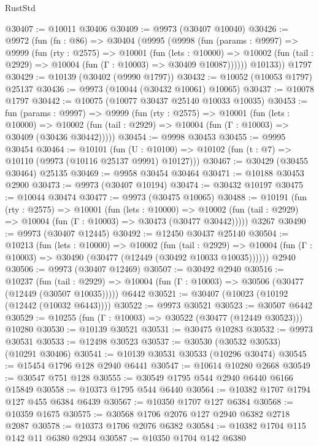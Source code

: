 \begin{lexlean}{RustStd}
\begin{coremodule}
@30407 := @10011 @30406
@30409 := @9973 (@30407 @10040)
@30426 := @9972
    (fun (fn : @86) =>
    @30404
      (@9995
        (@9998
          (fun (params : @9997) =>
          @9999
            (fun (rty : @2575) =>
            @10001
              (fun (lets : @10000) =>
              @10002 (fun (tail : @2929) => @10004 (fun (Γ : @10003) => @30409 @10087))))))
        @10133))
    @1797
@30429 := @10139 (@30402 (@9990 @1797))
@30432 := @10052 (@10053 @1797) @25137
@30436 := @9973 (@10044 (@30432 @10061) @10065)
@30437 := @10078 @1797
@30442 := @10075 (@10077 @30437 @25140 @10033 @10035)
@30453 := fun (params : @9997) =>
  @9999
    (fun (rty : @2575) =>
    @10001
      (fun (lets : @10000) =>
      @10002 (fun (tail : @2929) => @10004 (fun (Γ : @10003) => @30409 (@30436 @30442)))))
@30454 := @9998 @30453
@30455 := @9995 @30454
@30464 := @10101
    (fun (U : @10100) => @10102 (fun (t : @7) => @10110 (@9973 (@10116 @25137 @9991) @10127)))
@30467 := @30429 (@30455 @30464) @25135
@30469 := @9958 @30454 @30464
@30471 := @10188 @30453 @2900
@30473 := @9973 (@30407 @10194)
@30474 := @30432 @10197
@30475 := @10044 @30474
@30477 := @9973 (@30475 @10065)
@30488 := @10191
    (fun (rty : @2575) =>
    @10001
      (fun (lets : @10000) =>
      @10002 (fun (tail : @2929) => @10004 (fun (Γ : @10003) => @30473 (@30477 @30442)))))
    @3267
@30490 := @9973 (@30407 @12445)
@30492 := @12450 @30437 @25140
@30504 := @10213
    (fun (lets : @10000) =>
    @10002
      (fun (tail : @2929) =>
      @10004 (fun (Γ : @10003) => @30490 (@30477 (@12449 (@30492 @10033 @10035))))))
    @2940
@30506 := @9973 (@30407 @12469)
@30507 := @30492 @2940
@30516 := @10237
    (fun (tail : @2929) => @10004 (fun (Γ : @10003) => @30506 (@30477 (@12449 (@30507 @10035)))))
    @6442
@30521 := @30407 (@10023 (@10192 (@12442 (@10032 @6443))))
@30522 := @9973 @30521
@30523 := @30507 @6442
@30529 := @10255 (fun (Γ : @10003) => @30522 (@30477 (@12449 @30523))) @10280
@30530 := @10139 @30521
@30531 := @30475 @10283
@30532 := @9973 @30531
@30533 := @12498 @30523
@30537 := @30530 (@30532 @30533) (@10291 @30406)
@30541 := @10139 @30531 @30533 (@10296 @30474)
@30545 := @15454 @1796 @128 @2940 @6441
@30547 := @10614 @10280 @2668
@30549 := @30547 @751 @128
@30555 := @30549 @1795 @544 @2940 @6440 @6166 @15849
@30558 := @10373 @1795 @544 @6440
@30564 := @10382 @1707 @1794 @127 @455 @6384 @6439
@30567 := @10350 @1707 @127 @6384
@30568 := @10359 @1675
@30575 := @30568 @1706 @2076 @127 @2940 @6382 @2718 @2087
@30578 := @10373 @1706 @2076 @6382
@30584 := @10382 @1704 @115 @142 @11 @6380 @2934
@30587 := @10350 @1704 @142 @6380

\end{coremodule}
\end{lexlean}
